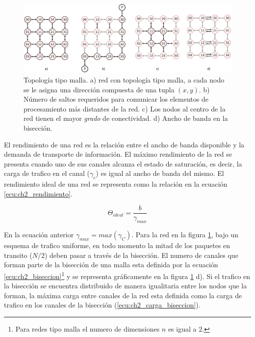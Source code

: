 \begin{figure}
	\begin{center}
		\includegraphics[scale = 0.6]{figures/ch2_mesh_caracteristicas.png}
	\end{center}
	\caption
		{	
			Topología tipo malla. a) red con topología tipo malla, a cada nodo se le asigna una dirección compuesta de una tupla $(x,y)$. b) Número de saltos requeridos para comunicar los elementos de procesamiento más distantes de la red. c) Los nodos al centro de la red tienen el mayor \textit{grado} de conectividad. d) Ancho de banda en la bisección.
		}
	\label{fig:ch2_mesh_caracteristicas}
\end{figure}

El rendimiento de una red es la relación entre el ancho de banda disponible y la demanda de transporte de información. El máximo rendimiento de la red se presenta cuando uno de sus canales alcanza el estado de saturación, es decir, la carga de trafico en el canal ($\gamma_{c}$) es igual al ancho de banda del mismo. El rendimiento ideal de una red se representa como la relación en la ecuación \ref{ecu:ch2_rendimiento}.

\begin{equation}
	\label{ecu:ch2_rendimiento}
		\Theta_{ideal} = \dfrac{b}{\gamma_{max}} 
\end{equation}

En la ecuación anterior $\gamma_{max} = max\left(\gamma_{C}\right)$. Para la red en la figura \ref{fig:ch2_mesh_caracteristicas}, bajo un esquema  de trafico uniforme, en todo momento la mitad de los paquetes en transito (${N/2}$) deben pasar a través de la bisección. El numero de canales que forman parte de la bisección de una malla esta definida por la ecuación \ref{ecu:ch2_biseccion}\footnote{Para redes tipo malla el numero de dimensiones $n$ es igual a $2$.} y se representa gráficamente en la figura \ref{fig:ch2_mesh_caracteristicas} d). Si el trafico en la bisección se encuentra distribuido de manera igualitaria entre los nodos que la forman, la máxima carga entre canales de la red esta definida como la carga de trafico en los canales de la bisección (\ref{ecu:ch2_carga_biseccion}).

